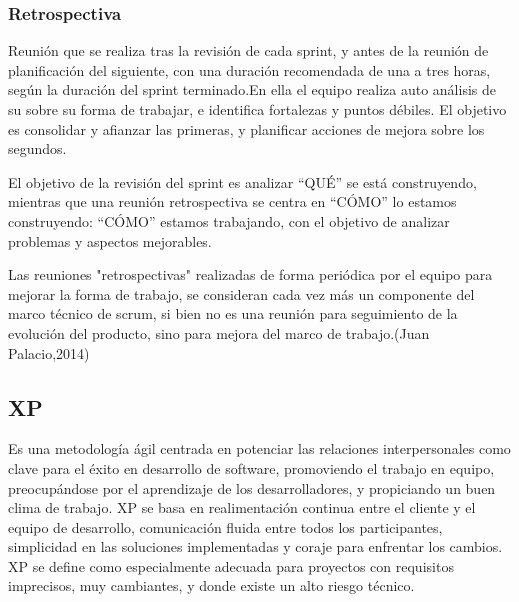 \setlength{\parskip}{0mm}


\subsubsection{Retrospectiva}
\setlength{\parskip}{5mm}

	Reunión que se realiza tras la revisión de cada sprint, y antes de la reunión de planificación del siguiente, con una duración recomendada de una a tres horas, según la duración del sprint terminado.En ella el equipo realiza auto análisis de su sobre su forma de trabajar, e identifica fortalezas y  puntos débiles. El objetivo es consolidar y afianzar las primeras, y planificar acciones de mejora sobre los segundos.

	El objetivo de la revisión del sprint es analizar “QUÉ” se está construyendo, mientras que una reunión retrospectiva se centra en “CÓMO” lo estamos construyendo: “CÓMO” estamos trabajando, con el objetivo de analizar problemas y aspectos mejorables.

	Las reuniones "retrospectivas" realizadas de forma periódica por el equipo para mejorar la forma de trabajo, se consideran cada vez más un componente del marco técnico de scrum, si bien no es una reunión para seguimiento de la evolución del producto, sino para mejora del marco de trabajo.(Juan Palacio,2014)
\setlength{\parskip}{0mm}

    

\subsection{XP}
\setlength{\parskip}{5mm}
Es una metodología ágil centrada en potenciar las relaciones interpersonales como clave para el éxito en desarrollo de software, promoviendo el trabajo en equipo, preocupándose por el aprendizaje de los desarrolladores, y propiciando un buen clima de trabajo. XP se basa en realimentación continua entre el cliente y el equipo de desarrollo, comunicación fluida entre todos los participantes, simplicidad en las soluciones implementadas y coraje para enfrentar los cambios. XP se define como especialmente adecuada para proyectos con requisitos imprecisos, muy cambiantes, y donde existe un alto riesgo técnico.
\setlength{\parskip}{0mm}

